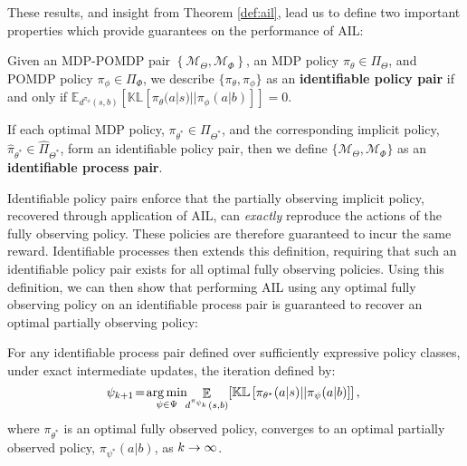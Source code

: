 These results, and insight from Theorem \ref{def:ail}, lead us to define two important properties which provide guarantees on the performance of AIL:
\begin{definition}
\label{def:consistency_pol} 
Given an MDP-POMDP pair $\left\lbrace \mathcal{M}_{\Theta}, \mathcal{M}_{\Phi} \right\rbrace$, an MDP policy $\pi_{\theta} \in \Pi_{\Theta}$, and POMDP policy $\pi_{\phi} \in \Pi_{\Phi}$, we describe $\{\pi_{\theta}, \pi_{\phi}\}$ as an \textbf{identifiable policy pair} if and only if $\mathbb{E}_{d^{\pi_{\phi}}(s,b)} \left[ \mathbb{KL} \left[ \pi_{\theta}(a | s) || \pi_{\phi}(a | b) \right] \right] = 0$.  
\end{definition}
\begin{definition}
\label{def:consistency_proc} 
If each optimal MDP policy, $\pi_{\theta^*} \in \Pi_{\Theta^*}$, and the corresponding implicit policy, $\hat{\pi}_{\theta^*} \in \hat{\Pi}_{\Theta^*}$, form an identifiable policy pair, then we define $\{\mathcal{M}_{\Theta}, \mathcal{M}_{\Phi}\}$ as an \textbf{identifiable process pair}.  
\end{definition}
Identifiable policy pairs enforce that the partially observing implicit policy, recovered through application of AIL, can \emph{exactly} reproduce the actions of the fully observing policy.  These policies are therefore guaranteed to incur the same reward.  Identifiable processes then extends this definition, requiring that such an identifiable policy pair exists for all optimal fully observing policies.  Using this definition, we can then show that performing AIL using any optimal fully observing policy on an identifiable process pair is guaranteed to recover an optimal partially observing policy: 
\begin{theorem}
\label{thm:consistency_conv}
For any identifiable process pair defined over sufficiently expressive policy classes, under exact intermediate updates, the iteration defined by:
\begin{equation}
    \hspace*{-0.1cm} \psi_{k+1} \!= \!\mathop{\argmin}_{\psi \in \Psi} \!\! \mathop{\mathbb{E}}_{d^{\pi_{\psi_k}}(s,b)} \! \left[  \mathbb{KL} \left[ \pi_{\theta^*}(a|s) || \pi_\psi(a|b) \right] \right],
\end{equation}
where $\pi_{\theta^*}$ is an optimal fully observed policy, converges to an optimal partially observed policy, $\pi_{\psi^*}(a|b)$, as $k \rightarrow \infty$.
\end{theorem}
